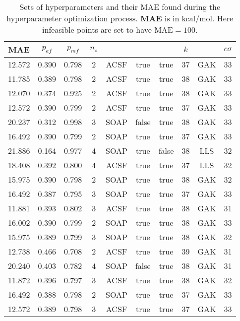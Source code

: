 \documentclass[12pt]{article}
\begin{document}
\begin{table}[H]
	\centering
	\caption{Sets of hyperparameters and their MAE found during the hyperparameter optimization process. \textbf{MAE} is in kcal/mol. Here infeasible points are set to have $\text{MAE} = 100$.} 
	\begin{tabular}{|c|c|c|c|c|c|c|c|c|c|}
		\hline
		\textbf{MAE}	& $p_{af}$ & $p_{mf}$ & $n_s$ & \codeword{ftype} & \codeword{norm_af} & \codeword{norm_mf} & $k$ & \codeword{model} & $c\sigma$	\\ \hline
		12.572	& 0.390	& 0.798	& 2	& ACSF	& true	& true	& 37	& GAK	& 33	\\ \hline
		11.785	& 0.389	& 0.798	& 2	& ACSF	& true	& true	& 38	& GAK	& 33	\\ \hline
		12.070	& 0.374	& 0.925	& 2	& ACSF	& true	& true	& 38	& GAK	& 33	\\ \hline
		12.572	& 0.390	& 0.799	& 2	& ACSF	& true	& true	& 37	& GAK	& 33	\\ \hline
		20.237	& 0.312	& 0.998	& 3	& SOAP	& false	& true	& 38	& GAK	& 33	\\ \hline
		16.492	& 0.390	& 0.799	& 2	& SOAP	& true	& true	& 37	& GAK	& 33	\\ \hline
		21.886	& 0.164	& 0.977	& 4	& SOAP	& true	& false	& 38	& LLS	& 32	\\ \hline
		18.408	& 0.392	& 0.800	& 4	& ACSF	& true	& true	& 37	& LLS	& 32	\\ \hline
		15.975	& 0.390	& 0.798	& 2	& SOAP	& true	& true	& 38	& GAK	& 32	\\ \hline
		16.492	& 0.387	& 0.795	& 3	& SOAP	& true	& true	& 37	& GAK	& 33	\\ \hline
		11.881	& 0.393	& 0.802	& 3	& ACSF	& true	& true	& 38	& GAK	& 31	\\ \hline
		16.002	& 0.390	& 0.799	& 2	& SOAP	& true	& true	& 38	& GAK	& 33	\\ \hline
		15.975	& 0.389	& 0.799	& 3	& SOAP	& true	& true	& 38	& GAK	& 32	\\ \hline
		12.738	& 0.466	& 0.708	& 2	& ACSF	& true	& true	& 39	& GAK	& 31	\\ \hline
		20.240	& 0.403	& 0.782	& 4	& SOAP	& false	& true	& 38	& GAK	& 31	\\ \hline
		11.872	& 0.396	& 0.797	& 3	& ACSF	& true	& true	& 38	& GAK	& 32	\\ \hline
		16.492	& 0.388	& 0.798	& 2	& SOAP	& true	& true	& 37	& GAK	& 33	\\ \hline
		12.572	& 0.389	& 0.798	& 3	& ACSF	& true	& true	& 37	& GAK	& 33	\\ \hline

\end{tabular}
\end{table}
\end{document}
